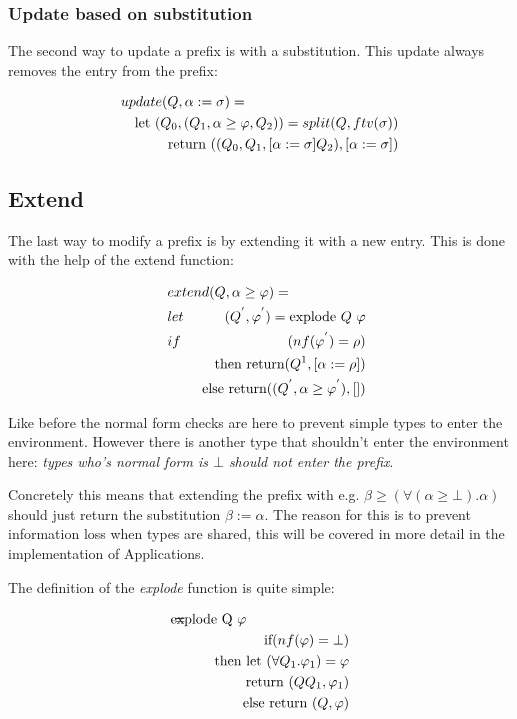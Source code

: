\subsubsection{Update based on substitution}
The second way to update a prefix is with a substitution. This update always removes the entry from the prefix:

\begin{eqnarray*}
\lefteqn{update(Q, \alpha := \sigma) =} \\
 & & \textrm{let } (Q_0, (Q_1, \alpha \geq \varphi, Q_2)) = split(Q, ftv(\sigma)) \\
 & & \textrm{return } ((Q_0, Q_1, \lbrack \alpha := \sigma \rbrack Q_2), \lbrack \alpha := \sigma \rbrack)
\end{eqnarray*}
\subsection{Extend}
The last way to modify a prefix is by extending it with a new entry. This is done with the help of the extend function:

\begin{eqnarray*}
\lefteqn{extend(Q,\alpha \geq \varphi) = } \\
\hspace{10pt} &let& (Q^{'}, \varphi^{'}) = \textrm{explode } Q \textrm{ } \varphi \\
              &if&  (nf(\varphi^{'}) = \rho) \\
              & & \textrm{     then return} (Q^{1}, \lbrack \alpha := \rho \rbrack) \\
              & & \textrm{     else return} ((Q^{'}, \alpha \geq \varphi^{'}),\lbrack \rbrack)
\end{eqnarray*}

Like before the normal form checks are here to prevent simple types to enter the environment. However there is another type that shouldn't enter the environment here: \emph{types who's normal form is $\bot$ should not enter the prefix}. 

Concretely this means that extending the prefix with e.g. $\beta \geq (\forall(\alpha \geq \bot).\alpha)$ should just return the substitution $\beta := \alpha$. The reason for this is to prevent information loss when types are shared, this will be covered in more detail in the implementation of Applications.

The definition of the \emph{explode} function is quite simple:

\begin{eqnarray*}
\lefteqn{\textrm{explode Q $\varphi$}} = \\
& & \textrm{if} (nf(\varphi) = \bot) \\
& & \quad \textrm{then let } (\forall Q_1 . \varphi_1) = \varphi \\
& & \quad \quad \quad \textrm{     return } (Q Q_1, \varphi_1) \\
& & \quad \textrm{else return } (Q, \varphi)
\end{eqnarray*}

